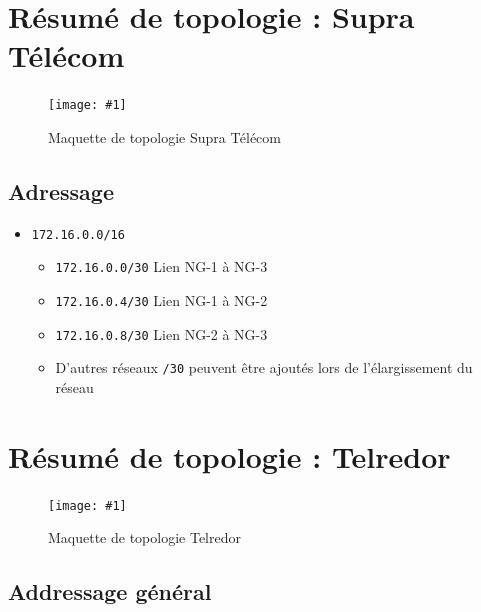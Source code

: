 \documentclass{article}
\newenvironment{figue}[1]{
	\par
	\bigskip
	\begin{figure}[h]
	\begin{center}
	  \texttt{[image: \#1]}
	\end{center}
}{
	\end{figure}
	\bigskip
}
\newcommand{\tlr}{Telredor\xspace}
\newcommand{\spr}{Supra Télécom\xspace}
\begin{document}
\clearpage
\section{Résumé de topologie : \spr}

\begin{figue}{img/nuage-supra.pdf}
	\caption{Maquette de topologie \spr}
\end{figue}

\subsection{Adressage}

\begin{itemize}
	\item \texttt{172.16.0.0/16}
	\begin{itemize}
		\item \texttt{172.16.0.0/30} Lien NG-1 à NG-3
		\item \texttt{172.16.0.4/30} Lien NG-1 à NG-2
		\item \texttt{172.16.0.8/30} Lien NG-2 à NG-3
		\item D'autres réseaux \texttt{/30} peuvent être ajoutés lors de l'élargissement du réseau
	\end{itemize}
\end{itemize}



\section{Résumé de topologie : \tlr}

\begin{figue}{img/telredor.pdf}
	\caption{Maquette de topologie \tlr}
\end{figue}

\subsection{Addressage général}
\end{document}
